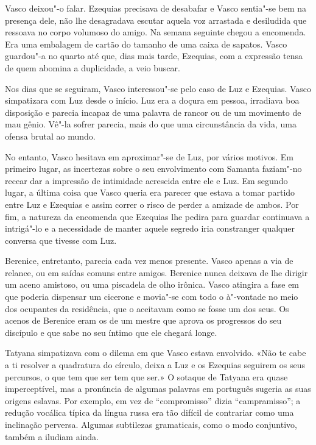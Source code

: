 Vasco
deixou"-o falar. Ezequias precisava de desabafar e Vasco sentia"-se bem na
presença dele, não lhe desagradava escutar aquela voz arrastada e
desiludida que ressoava no corpo volumoso do amigo. Na semana seguinte
chegou a encomenda. Era uma embalagem de cartão do tamanho de uma
caixa de sapatos. Vasco guardou"-a no quarto até que, dias mais tarde,
Ezequias, com a expressão tensa de quem abomina a duplicidade, a veio buscar.

Nos dias que se seguiram, Vasco interessou"-se pelo caso de Luz e
Ezequias. Vasco simpatizara com Luz desde o início. Luz era a doçura em
pessoa, irradiava boa disposição e parecia incapaz de uma palavra de
rancor ou de um movimento de mau gênio. Vê"-la sofrer parecia, mais do
que uma circunstância da vida, uma ofensa brutal ao mundo.

No entanto, Vasco hesitava em aproximar"-se de Luz, por vários motivos.
Em primeiro lugar, as incertezas sobre o seu envolvimento com Samanta
faziam"-no recear dar a impressão de intimidade acrescida entre ele e
Luz. Em segundo lugar, a última coisa que Vasco queria era parecer que
estava a tomar partido entre Luz e Ezequias e assim correr o risco de
perder a amizade de ambos. Por fim, a natureza da encomenda que Ezequias
lhe pedira para guardar continuava a intrigá"-lo e a
necessidade de manter aquele segredo iria constranger qualquer conversa
que tivesse com Luz.

Berenice, entretanto, parecia cada vez menos presente. Vasco apenas a
via de relance, ou em saídas comuns entre amigos. Berenice nunca deixava
de lhe dirigir um aceno amistoso, ou uma piscadela de olho irônica.
Vasco atingira a fase em que poderia dispensar um cicerone e movia"-se
com todo o à"-vontade no meio dos ocupantes da residência, que o aceitavam como se fosse um dos seus. Os acenos de Berenice eram os de um
mestre que aprova os progressos do seu discípulo e que sabe no seu
íntimo que ele chegará longe.

Tatyana simpatizava com o dilema em que Vasco estava envolvido. «Não te
cabe a ti resolver a quadratura do círculo, deixa a Luz e os Ezequias
seguirem os seus percursos, o que tem que ser tem que ser.» O sotaque de
Tatyana era quase imperceptível, mas a pronúncia de algumas palavras em
português sugeria as suas origens eslavas. Por exemplo, em vez de
``compromisso'' dizia ``campramisso''; a redução vocálica típica da
língua russa era tão difícil de contrariar como uma inclinação perversa.
Algumas subtilezas gramaticais, como o modo conjuntivo, também a iludiam
ainda.

